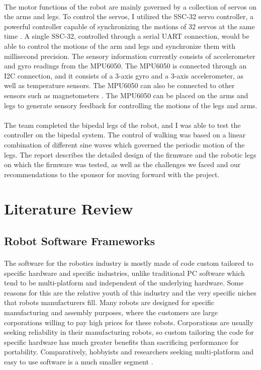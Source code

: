 \documentclass[titlepage,letterpaper,12pt]{article}
\begin{document}
\paragraph{}The motor functions of the robot are mainly governed by a collection
of servos on the arms and legs. To control the servos, I utilized the SSC-32
servo controller, a powerful controller capable of synchronizing the motions of
32 servos at the same time \cite{sscdata}. A single SSC-32, controlled through a
serial UART connection, would be able to control the motions of the arm and legs
and synchronize them with millisecond precision.  The sensory information
currently consists of accelerometer and gyro readings from the MPU6050. The
MPU6050 is connected through an I2C connection, and it consists of a 3-axis gyro
and a 3-axis accelerometer, as well as temperature sensors. The MPU6050 can also
be connected to other sensors such as magnetometers \cite{mpu6050data}. The
MPU6050 can be placed on the arms and legs to generate sensory feedback for
controlling the motions of the legs and arms.

\paragraph{}The team completed the bipedal legs of the robot, and I was able to
test the controller on the bipedal system. The control of walking was based on a
linear combination of different sine waves which governed the periodic motion of
the legs. The report describes the detailed design of the firmware and the
robotic legs on which the firmware was tested, as well as the challenges we
faced and our recommendations to the sponsor for moving forward with the
project.

\section{Literature Review}
\subsection{Robot Software Frameworks}
\paragraph{}The software for the robotics industry is mostly made of code custom
tailored to specific hardware and specific industries, unlike traditional PC
software which tend to be multi-platform and independent of the underlying hardware.
Some reasons for this are the relative youth of this industry and the very
specific niches that robots manufacturers fill. Many robots are designed for
specific manufacturing and assembly purposes, where the customers are large
corporations willing to pay high prices for these robots. Corporations are
usually seeking reliability in their manufacturing robots, so custom tailoring
the code for specific hardware has much greater benefits than sacrificing
performance for portability. Comparatively, hobbyists and researchers seeking
multi-platform and easy to use software is a much smaller segment
\cite{jang2010opros}.
\end{document}
